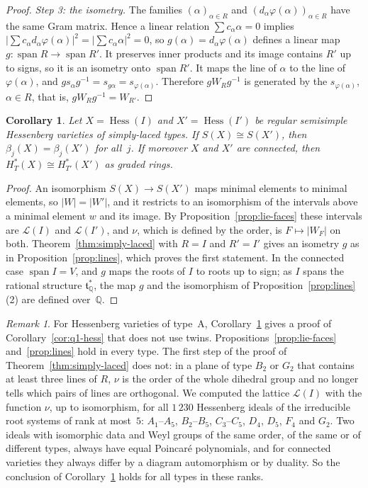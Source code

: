 \documentclass[11pt,a4paper]{article}
\numberwithin{equation}{section}
\theoremstyle{plain}
\newtheorem{corollary}[theorem]{Corollary}
\theoremstyle{definition}
\theoremstyle{remark}
\newtheorem{remark}[theorem]{Remark}
\newcommand{\Q}{\mathbb{Q}}
\newcommand{\HT}{H^{*}_{T}}
\newcommand{\cL}{\mathcal{L}}
\DeclareMathOperator{\Hess}{Hess}
\DeclareMathOperator{\spn}{span}
\begin{document}
\begin{proof}
\emph{Step 3: the isometry.} The families $(\alpha)_{\alpha\in R}$ and $(d_\alpha\varphi(\alpha))_{\alpha\in R}$ have the same Gram matrix. Hence a linear relation $\sum c_\alpha\alpha=0$ implies $\bigl|\sum c_\alpha d_\alpha\varphi(\alpha)\bigr|^2=\bigl|\sum c_\alpha\alpha\bigr|^2=0$, so $g(\alpha)=d_\alpha\varphi(\alpha)$ defines a linear map $g\colon\spn R\to\spn R'$. It preserves inner products and its image contains $R'$ up to signs, so it is an isometry onto $\spn R'$. It maps the line of $\alpha$ to the line of $\varphi(\alpha)$, and $gs_\alpha g^{-1}=s_{g\alpha}=s_{\varphi(\alpha)}$. Therefore $gW_Rg^{-1}$ is generated by the $s_{\varphi(\alpha)}$, $\alpha\in R$, that is, $gW_Rg^{-1}=W_{R'}$.
\end{proof}

\begin{corollary}\label{cor:q1-ade}
Let $X=\Hess(I)$ and $X'=\Hess(I')$ be regular semisimple Hessenberg varieties of simply-laced types. If $S(X)\cong S(X')$, then $\beta_j(X)=\beta_j(X')$ for all~$j$. If moreover $X$ and $X'$ are connected, then $\HT(X)\cong H^*_{T'}(X')$ as graded rings.
\end{corollary}

\begin{proof}
An isomorphism $S(X)\to S(X')$ maps minimal elements to minimal elements, so $|W|=|W'|$, and it restricts to an isomorphism of the intervals above a minimal element $w$ and its image. By Proposition~\ref{prop:lie-faces} these intervals are $\cL(I)$ and $\cL(I')$, and $\nu$, which is defined by the order, is $F\mapsto|W_F|$ on both. Theorem~\ref{thm:simply-laced} with $R=I$ and $R'=I'$ gives an isometry $g$ as in Proposition~\ref{prop:lines}, which proves the first statement. In the connected case $\spn I=V$, and $g$ maps the roots of $I$ to roots up to sign; as $I$ spans the rational structure $\mathfrak t^*_\Q$, the map $g$ and the isomorphism of Proposition~\ref{prop:lines}(2) are defined over~$\Q$.
\end{proof}

\begin{remark}\label{rem:non-simply-laced}
For Hessenberg varieties of type~A, Corollary~\ref{cor:q1-ade} gives a proof of Corollary~\ref{cor:q1-hess} that does not use twins. Propositions~\ref{prop:lie-faces} and~\ref{prop:lines} hold in every type. The first step of the proof of Theorem~\ref{thm:simply-laced} does not: in a plane of type $B_2$ or $G_2$ that contains at least three lines of $R$, $\nu$ is the order of the whole dihedral group and no longer tells which pairs of lines are orthogonal. We computed the lattice $\cL(I)$ with the function $\nu$, up to isomorphism, for all $1\,230$ Hessenberg ideals of the irreducible root systems of rank at most~$5$: $A_1$--$A_5$, $B_2$--$B_5$, $C_3$--$C_5$, $D_4$, $D_5$, $F_4$ and $G_2$. Two ideals with isomorphic data and Weyl groups of the same order, of the same or of different types, always have equal Poincaré polynomials, and for connected varieties they always differ by a diagram automorphism or by duality. So the conclusion of Corollary~\ref{cor:q1-ade} holds for all types in these ranks.
\end{remark}
\end{document}
